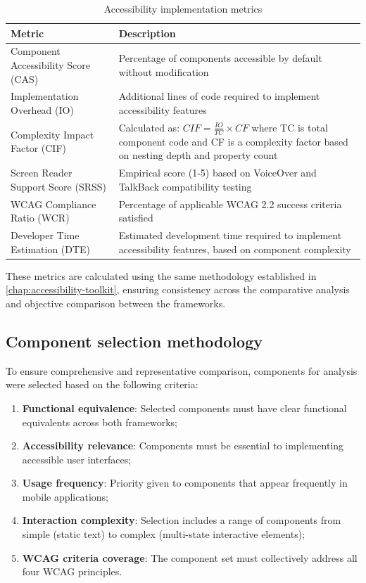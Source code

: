 \begin{table}[ht]
\caption{Accessibility implementation metrics}
\label{tab:accessibility_metrics}
\centering
\begin{tabular}{|p{4cm}|p{10cm}|}
\hline
\textbf{Metric} & \textbf{Description} \\
\hline
Component Accessibility Score (CAS) & Percentage of components accessible by default without modification \\
\hline
Implementation Overhead (IO) & Additional lines of code required to implement accessibility features \\
\hline
Complexity Impact Factor (CIF) & Calculated as: $CIF = \frac{IO}{TC} \times CF$ where TC is total component code and CF is a complexity factor based on nesting depth and property count \\
\hline
Screen Reader Support Score (SRSS) & Empirical score (1-5) based on VoiceOver and TalkBack compatibility testing \\
\hline
WCAG Compliance Ratio (WCR) & Percentage of applicable WCAG 2.2 success criteria satisfied \\
\hline
Developer Time Estimation (DTE) & Estimated development time required to implement accessibility features, based on component complexity \\
\hline
\end{tabular}
\end{table}

These metrics are calculated using the same methodology established in \ref{chap:accessibility-toolkit}, ensuring consistency across the comparative analysis and objective comparison between the frameworks.

\subsection{Component selection methodology}

To ensure comprehensive and representative comparison, components for analysis were selected based on the following criteria:

\begin{enumerate}
    \item \textbf{Functional equivalence}: Selected components must have clear functional equivalents across both frameworks;
    
    \item \textbf{Accessibility relevance}: Components must be essential to implementing accessible user interfaces;
    
    \item \textbf{Usage frequency}: Priority given to components that appear frequently in mobile applications;
    
    \item \textbf{Interaction complexity}: Selection includes a range of components from simple (static text) to complex (multi-state interactive elements);
    
    \item \textbf{WCAG criteria coverage}: The component set must collectively address all four WCAG principles.
\end{enumerate}

